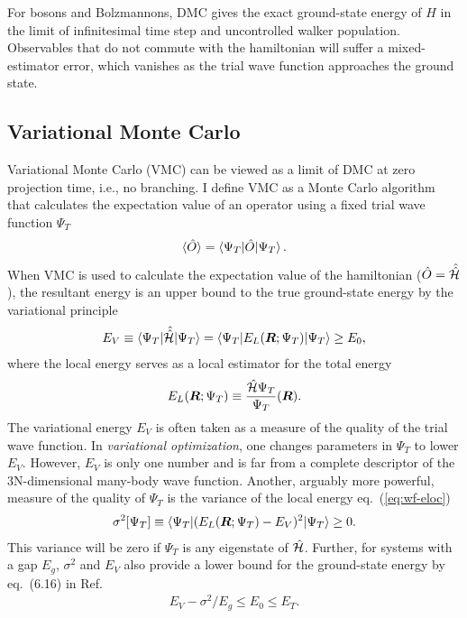 For bosons and Bolzmannons, DMC gives the exact ground-state energy of $H$ in the limit of infinitesimal time step and uncontrolled walker population. Observables that do not commute with the hamiltonian will suffer a mixed-estimator error, which vanishes as the trial wave function approaches the ground state.

\subsection{Variational Monte Carlo}
Variational Monte Carlo (VMC) can be viewed as a limit of DMC at zero projection time, i.e., no branching. I define VMC as a Monte Carlo algorithm that calculates the expectation value of an operator using a fixed trial wave function $\Psi_T$
\begin{align} \label{eq:vmc}
\braket{\hat{O}} = \braket{\Psi_T|\hat{O}|\Psi_T}.
\end{align}
When VMC is used to calculate the expectation value of the hamiltonian ($\hat{O}=\hat{\hat{\mathcal{H}}}$), the resultant energy is an upper bound to the true ground-state energy by the variational principle
\begin{align} \label{eq:wf-variational}
E_V\equiv \braket{\Psi_T|\hat{\hat{\mathcal{H}}}|\Psi_T} = \braket{\Psi_T|E_L(\boldsymbol{R};\Psi_T)|\Psi_T} \ge E_0,
\end{align}
where the local energy serves as a local estimator for the total energy
\begin{align} \label{eq:wf-eloc}
E_L(\boldsymbol{R};\Psi_T) \equiv \dfrac{\hat{\mathcal{H}}\Psi_T}{\Psi_T} (\boldsymbol{R}).
\end{align}
The variational energy $E_V$ is often taken as a measure of the quality of the trial wave function.
In \emph{variational optimization}, one changes parameters in $\Psi_T$ to lower $E_V$.
However, $E_V$ is only one number and is far from a complete descriptor of the 3N-dimensional many-body wave function.
Another, arguably more powerful, measure of the quality of $\Psi_T$ is the variance of the local energy eq.~(\ref{eq:wf-eloc})
\begin{align}
\sigma^2[\Psi_T] \equiv \braket{\Psi_T|(E_L(\boldsymbol{R};\Psi_T)-E_V)^2|\Psi_T}\ge 0.
\end{align}
This variance will be zero if $\Psi_T$ is any eigenstate of $\hat{\mathcal{H}}$. Further, for systems with a gap $E_g$, $\sigma^2$ and $E_V$ also provide a lower bound for the ground-state energy by eq.~(6.16) in Ref.~\cite{Martin2016}
\begin{align}
E_V-\sigma^2/E_g \le E_0 \le E_T.
\end{align}

